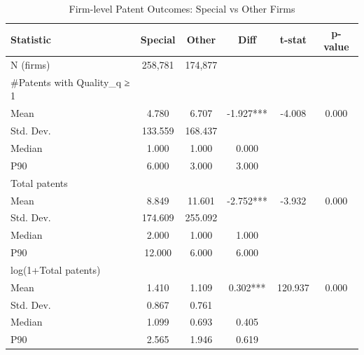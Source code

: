 \begin{table}
\caption{Firm-level Patent Outcomes: Special vs Other Firms}
\label{tab:firm_compare}
\begin{tabular}{lccccc}
\toprule
Statistic & Special & Other & Diff & t-stat & p-value \\
\midrule
N (firms) & 258,781 & 174,877 &  &  &  \\
#Patents with Quality_q ≥ 1 &  &  &  &  &  \\
  Mean & 4.780 & 6.707 & -1.927*** & -4.008 & 0.000 \\
  Std. Dev. & 133.559 & 168.437 &  &  &  \\
  Median & 1.000 & 1.000 & 0.000 &  &  \\
  P90 & 6.000 & 3.000 & 3.000 &  &  \\
Total patents &  &  &  &  &  \\
  Mean & 8.849 & 11.601 & -2.752*** & -3.932 & 0.000 \\
  Std. Dev. & 174.609 & 255.092 &  &  &  \\
  Median & 2.000 & 1.000 & 1.000 &  &  \\
  P90 & 12.000 & 6.000 & 6.000 &  &  \\
log(1+Total patents) &  &  &  &  &  \\
  Mean & 1.410 & 1.109 & 0.302*** & 120.937 & 0.000 \\
  Std. Dev. & 0.867 & 0.761 &  &  &  \\
  Median & 1.099 & 0.693 & 0.405 &  &  \\
  P90 & 2.565 & 1.946 & 0.619 &  &  \\
\bottomrule
\end{tabular}
\end{table}
